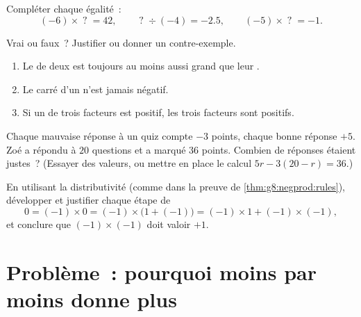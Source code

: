 \begin{exercise}[$\star\star$]\label{exo:g8:negprod:8}
Compléter chaque égalité~:
\[
(-6) \times \;?\; = 42, \qquad
\;?\; \div (-4) = -2.5, \qquad
(-5) \times \;?\; = -1 .
\]
\end{exercise}

\begin{exercise}[$\star\star$]\label{exo:g8:negprod:9}
Vrai ou faux~? Justifier ou donner un contre-exemple.
\begin{enumerate}
  \item Le  de deux  est toujours au moins
        aussi grand que leur .
  \item Le carré d'un  n'est jamais négatif.
  \item Si un  de trois facteurs est positif, les trois
        facteurs sont positifs.
\end{enumerate}
\end{exercise}

\begin{exercise}[$\star\star$]\label{exo:g8:negprod:10}
Chaque mauvaise réponse à un quiz compte $-3$ points, chaque bonne
réponse $+5$. Zoé a répondu à $20$ questions et a marqué $36$ points.
Combien de réponses étaient justes~? (Essayer des valeurs, ou mettre
en place le calcul $5r - 3(20 - r) = 36$.)
\end{exercise}

\begin{exercise}[$\star\star\star$]\label{exo:g8:negprod:11}
En utilisant la distributivité (comme dans la preuve de
\cref{thm:g8:negprod:rules}), développer et justifier chaque étape de
\[
0 = (-1) \times 0 = (-1) \times \bigl(1 + (-1)\bigr)
= (-1) \times 1 + (-1) \times (-1),
\]
et conclure que $(-1) \times (-1)$ doit valoir $+1$.
\end{exercise}

\section{Problème~: pourquoi moins par moins donne plus}

